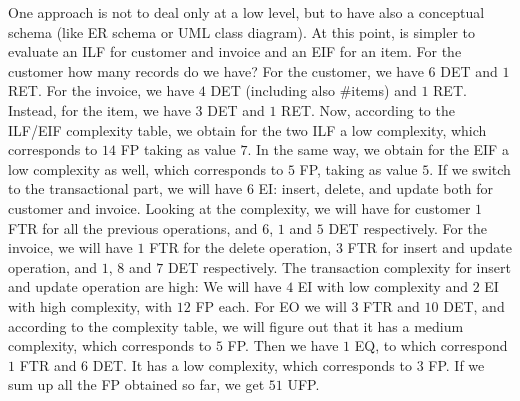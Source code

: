 One approach is not to deal only at a low level, but to have also a conceptual schema (like ER schema or UML class diagram).
At this point, is simpler to evaluate an ILF for customer and invoice and an EIF for an item.
For the customer how many records do we have?
For the customer, we have $6$ DET and $1$ RET.
For the invoice, we have $4$ DET (including also $\#$items) and $1$ RET.
Instead, for the item, we have $3$ DET and $1$ RET.
Now, according to the ILF/EIF complexity table, we obtain for the two ILF a low complexity, which corresponds to $14$ FP taking as value $7$. In the same way, we obtain for the EIF a low complexity as well, which corresponds to $5$ FP, taking as value $5$.
If we switch to the transactional part, we will have 6 EI: insert, delete, and update both for customer and invoice.
Looking at the complexity, we will have for customer $1$ FTR for all the previous operations, and $6$, $1$ and $5$ DET respectively.
For the invoice, we will have $1$ FTR for the delete operation, $3$ FTR for insert and update operation, and $1$, $8$ and $7$ DET respectively.
The transaction complexity for insert and update operation are high: We will have $4$ EI with low complexity and $2$ EI with high complexity, with $12$ FP each.
For EO we will $3$ FTR and $10$ DET, and according to the complexity table, we will figure out that it has a medium complexity, which corresponds to $5$ FP.
Then we have $1$ EQ, to which correspond $1$ FTR and $6$ DET. It has a low complexity, which corresponds to $3$ FP.
If we sum up all the FP obtained so far, we get $51$ UFP.
